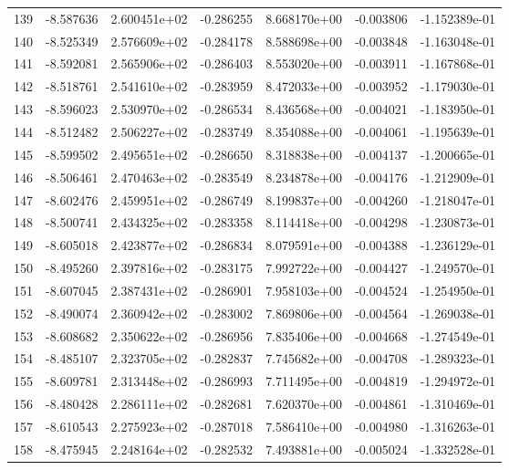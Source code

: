 \begin{tabular}{rrrrrrr}
 139 &  -8.587636 &  2.600451e+02 & -0.286255 &  8.668170e+00 &  -0.003806 & -1.152389e-01 \\
 140 &  -8.525349 &  2.576609e+02 & -0.284178 &  8.588698e+00 &  -0.003848 & -1.163048e-01 \\
 141 &  -8.592081 &  2.565906e+02 & -0.286403 &  8.553020e+00 &  -0.003911 & -1.167868e-01 \\
 142 &  -8.518761 &  2.541610e+02 & -0.283959 &  8.472033e+00 &  -0.003952 & -1.179030e-01 \\
 143 &  -8.596023 &  2.530970e+02 & -0.286534 &  8.436568e+00 &  -0.004021 & -1.183950e-01 \\
 144 &  -8.512482 &  2.506227e+02 & -0.283749 &  8.354088e+00 &  -0.004061 & -1.195639e-01 \\
 145 &  -8.599502 &  2.495651e+02 & -0.286650 &  8.318838e+00 &  -0.004137 & -1.200665e-01 \\
 146 &  -8.506461 &  2.470463e+02 & -0.283549 &  8.234878e+00 &  -0.004176 & -1.212909e-01 \\
 147 &  -8.602476 &  2.459951e+02 & -0.286749 &  8.199837e+00 &  -0.004260 & -1.218047e-01 \\
 148 &  -8.500741 &  2.434325e+02 & -0.283358 &  8.114418e+00 &  -0.004298 & -1.230873e-01 \\
 149 &  -8.605018 &  2.423877e+02 & -0.286834 &  8.079591e+00 &  -0.004388 & -1.236129e-01 \\
 150 &  -8.495260 &  2.397816e+02 & -0.283175 &  7.992722e+00 &  -0.004427 & -1.249570e-01 \\
 151 &  -8.607045 &  2.387431e+02 & -0.286901 &  7.958103e+00 &  -0.004524 & -1.254950e-01 \\
 152 &  -8.490074 &  2.360942e+02 & -0.283002 &  7.869806e+00 &  -0.004564 & -1.269038e-01 \\
 153 &  -8.608682 &  2.350622e+02 & -0.286956 &  7.835406e+00 &  -0.004668 & -1.274549e-01 \\
 154 &  -8.485107 &  2.323705e+02 & -0.282837 &  7.745682e+00 &  -0.004708 & -1.289323e-01 \\
 155 &  -8.609781 &  2.313448e+02 & -0.286993 &  7.711495e+00 &  -0.004819 & -1.294972e-01 \\
 156 &  -8.480428 &  2.286111e+02 & -0.282681 &  7.620370e+00 &  -0.004861 & -1.310469e-01 \\
 157 &  -8.610543 &  2.275923e+02 & -0.287018 &  7.586410e+00 &  -0.004980 & -1.316263e-01 \\
 158 &  -8.475945 &  2.248164e+02 & -0.282532 &  7.493881e+00 &  -0.005024 & -1.332528e-01 \\

\end{tabular}
